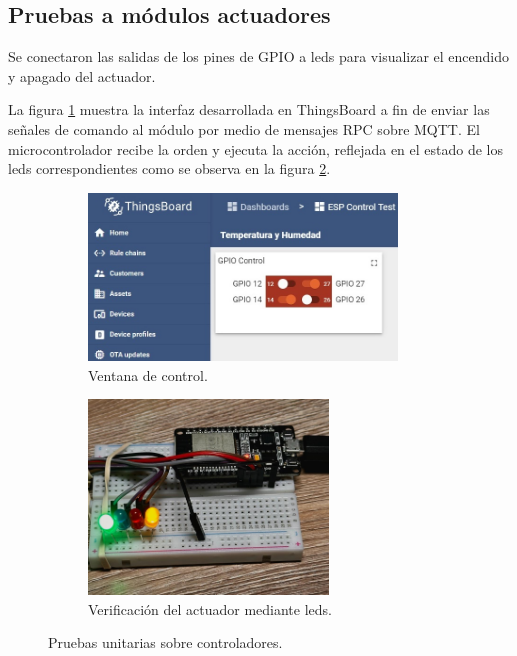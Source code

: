 







\subsection{Pruebas a módulos actuadores}
\label{sec:Pruebas a módulos actuadores}

Se conectaron las salidas de los pines de GPIO a leds para visualizar el encendido y apagado del actuador. 

La figura \ref{fig:control_test1} muestra la interfaz desarrollada en ThingsBoard a fin de enviar las señales de comando al módulo por medio de mensajes RPC sobre MQTT. El microcontrolador recibe la orden y ejecuta la acción, reflejada en el estado de los leds correspondientes como se observa en la figura \ref{fig:control_test2}.



\begin{figure}[htpb]
     \centering
       \begin{subfigure}[b]{0.50\textwidth}
	    \centering
		 \includegraphics[width=0.9\textwidth]{./Figures/chapter4/control_unit_test_1.jpg}
		\caption{Ventana de control.}
		\label{fig:control_test1}
     \end{subfigure}
          \hfill
     \begin{subfigure}[b]{0.45\textwidth}
		\centering
		\includegraphics[width=0.70\textwidth]{./Figures/chapter4/control_test2.jpg}
		\caption{Verificación del actuador mediante leds.}
		\label{fig:control_test2}
     \end{subfigure}
     \hfill
        \caption[Pruebas unitarias sobre controladores]{Pruebas unitarias sobre controladores.}
        \label{fig:control_test}
\end{figure}


